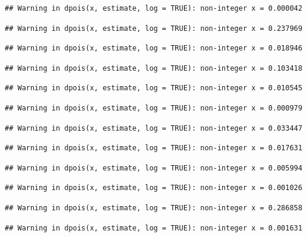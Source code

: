 \documentclass[]{article}
\begin{document}
\begin{verbatim}
## Warning in dpois(x, estimate, log = TRUE): non-integer x = 0.000042
\end{verbatim}

\begin{verbatim}
## Warning in dpois(x, estimate, log = TRUE): non-integer x = 0.237969
\end{verbatim}

\begin{verbatim}
## Warning in dpois(x, estimate, log = TRUE): non-integer x = 0.018946
\end{verbatim}

\begin{verbatim}
## Warning in dpois(x, estimate, log = TRUE): non-integer x = 0.103418
\end{verbatim}

\begin{verbatim}
## Warning in dpois(x, estimate, log = TRUE): non-integer x = 0.010545
\end{verbatim}

\begin{verbatim}
## Warning in dpois(x, estimate, log = TRUE): non-integer x = 0.000979
\end{verbatim}

\begin{verbatim}
## Warning in dpois(x, estimate, log = TRUE): non-integer x = 0.033447
\end{verbatim}

\begin{verbatim}
## Warning in dpois(x, estimate, log = TRUE): non-integer x = 0.017631
\end{verbatim}

\begin{verbatim}
## Warning in dpois(x, estimate, log = TRUE): non-integer x = 0.005994
\end{verbatim}

\begin{verbatim}
## Warning in dpois(x, estimate, log = TRUE): non-integer x = 0.001026
\end{verbatim}

\begin{verbatim}
## Warning in dpois(x, estimate, log = TRUE): non-integer x = 0.286858
\end{verbatim}

\begin{verbatim}
## Warning in dpois(x, estimate, log = TRUE): non-integer x = 0.001631
\end{verbatim}
\end{document}
